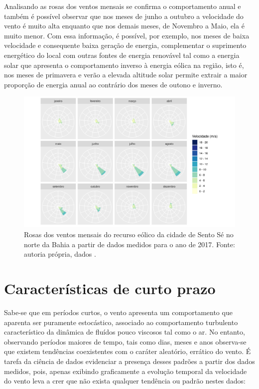 \documentclass[
	12pt,				%
	openright,			%
	oneside,			%
	a4paper,			%
	english,			%
	french,				%
	spanish,			%
	brazil				%
	]{abntex2}
\begin{document}
\newpage
Analisando as rosas dos ventos mensais se confirma o comportamento anual e também é possível observar que nos meses de junho a outubro a velocidade do vento é muito alta enquanto que nos demais meses, de Novembro a Maio, ela é muito menor. Com essa informação, é possível, por exemplo, nos meses de baixa velocidade e consequente baixa geração de energia, complementar o suprimento energético do local com outras fontes de energia renovável tal como a energia solar que apresenta o comportamento inverso à energia eólica na região, isto é, nos meses de primavera e verão a elevada altitude solar permite extrair a maior proporção de energia anual ao contrário dos meses de outono e inverno.

\begin{figure}[h]
    \centering
  	\hspace*{-1.4cm}   
	\includegraphics[scale=1]{windrose_monthly}
	\caption{Rosas dos ventos mensais do recurso eólico da cidade de Sento Sé no norte da Bahia a partir de dados medidos para o ano de 2017. Fonte: autoria própria, dados \cite{era5}.}
\end{figure}
\FloatBarrier

\chapter{Características de curto prazo}

Sabe-se que em períodos curtos, o vento apresenta um comportamento que aparenta ser puramente estocástico, associado ao comportamento turbulento característico da dinâmica de fluídos pouco viscosos tal como o ar. No entanto, observando períodos maiores de tempo, tais como dias, meses e anos observa-se que existem tendências coexistentes com o caráter aleatório, errático do vento. É tarefa da ciência de dados evidenciar a presença desses padrões a partir dos dados medidos, pois, apenas exibindo graficamente a evolução temporal da velocidade do vento leva a crer que não exista qualquer tendência ou padrão nestes dados:
\end{document}

